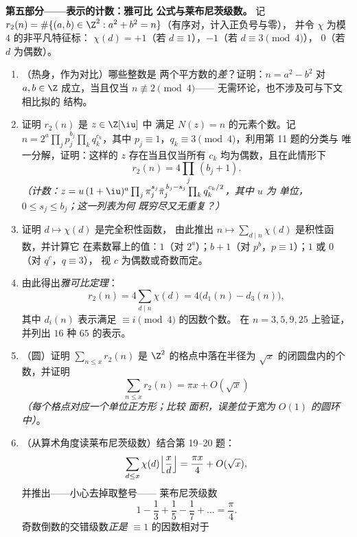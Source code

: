 \begin{problem}
\medskip
\noindent\textbf{第五部分——表示的计数：雅可比
公式与莱布尼茨级数。} 记 $r_2(n) = \#\{(a, b) \in
\Z^2 : a^2 + b^2 = n\}$（有序对，计入正负号与零），
并令 $\chi$ 为模 $4$ 的非平凡特征标：
$\chi(d) = +1$（若 $d \equiv 1$），$-1$（若 $d \equiv 3 \pmod4$），
$0$（若 $d$ 为偶数）。
\begin{enumerate}[resume]
  \item （热身，作为对比）哪些整数是
        两个平方数的\emph{差}？证明：$n = a^2 - b^2$
        对 $a, b \in \Z$ 成立，当且仅当 $n \not\equiv 2 \pmod 4$——
        无需环论，也不涉及可与下文相比拟的
        结构。
  \item 证明 $r_2(n)$ 是 $z \in \Z[\iu]$ 中
        满足 $N(z) = n$ 的元素个数。记 $n = 2^{a}\prod_jp_j^{b_j}
        \prod_kq_k^{c_k}$，其中 $p_j \equiv 1$，$q_k \equiv 3
        \pmod4$，利用第 11 题的分类与
        唯一分解，证明：这样的 $z$ 存在当且仅当所有
        $c_k$ 均为偶数，且在此情形下
        \[
        r_2(n) = 4\prod_j\,(b_j + 1) .
        \]
        \emph{（计数：$z = u\,(1+\iu)^{a}\prod_j\pi_j^{s_j}
        \bar\pi_j^{\,b_j - s_j}\prod_kq_k^{c_k/2}$，其中 $u$ 为
        单位，$0 \leq s_j \leq b_j$；这一列表为何
        既穷尽又无重复？）}
  \item 证明 $d \mapsto \chi(d)$ 是完全积性函数，
        由此推出 $n \mapsto
        \sum_{d \mid n}\chi(d)$ 是积性函数，并计算它
        在素数幂上的值：$1$（对 $2^a$）；$b + 1$（对
        $p^b$，$p \equiv 1$）；$1$ 或 $0$（对 $q^c$，$q \equiv 3$），
        视 $c$ 为偶数或奇数而定。
  \item 由此得出\emph{雅可比定理}：
        \[
        r_2(n) = 4\sum_{d \mid n}\chi(d) =
        4\bigl(d_1(n) - d_3(n)\bigr),
        \]
        其中 $d_i(n)$ 表示满足 $\equiv i \pmod 4$ 的因数个数。
        在 $n = 3, 5, 9, 25$ 上验证，并列出
        $16$ 种 $65$ 的表示。
  \item （圆）证明 $\sum_{n \leq x}r_2(n)$ 是
        $\Z^2$ 的格点中落在半径为
        $\sqrt x$ 的闭圆盘内的个数，并证明
        \[
        \sum_{n\leq x}r_2(n) = \pi x + O(\sqrt x)
        \]
        \emph{（每个格点对应一个单位正方形；比较
        面积，误差位于宽为
        $O(1)$ 的圆环中）}。
  \item （从算术角度读莱布尼茨级数）结合第 19--20 题：
        \[
        \sum_{d \leq x}\chi(d)\Bigl\lfloor\frac
        xd\Bigr\rfloor = \frac{\pi x}4 + O(\sqrt x),
        \]
        并推出——小心去掉取整号——
        莱布尼茨级数
        \[
        1 - \frac13 + \frac15 - \frac17 + \dots = \frac\pi4 .
        \]
        奇数倒数的交错级数\emph{正是}
        $\equiv 1$ 的因数相对于

\end{enumerate}
\end{problem}
